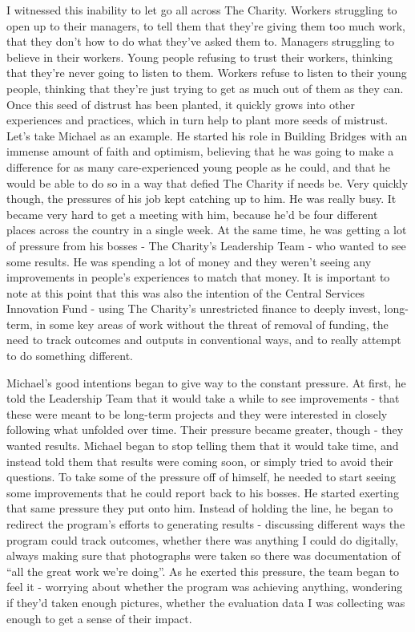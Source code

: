 I witnessed this inability to let go all across The Charity. Workers struggling to open up to their managers, to tell them that they’re giving them too much work, that they don’t how to do what they’ve asked them to. Managers struggling to believe in their workers. Young people refusing to trust their workers, thinking that they’re never going to listen to them. Workers refuse to listen to their young people, thinking that they’re just trying to get as much out of them as they can. Once this seed of distrust has been planted, it quickly grows into other experiences and practices, which in turn help to plant more seeds of mistrust. Let’s take Michael as an example. He started his role in Building Bridges with an immense amount of faith and optimism, believing that he was going to make a difference for as many care-experienced young people as he could, and that he would be able to do so in a way that defied The Charity if needs be. Very quickly though, the pressures of his job kept catching up to him. He was really busy. It became very hard to get a meeting with him, because he’d be four different places across the country in a single week. At the same time, he was getting a lot of pressure from his bosses - The Charity’s Leadership Team - who wanted to see some results. He was spending a lot of money and they weren’t seeing any improvements in people’s experiences to match that money. It is important to note at this point that this was also the intention of the Central Services Innovation Fund - using The Charity’s unrestricted finance to deeply invest, long-term, in some key areas of work without the threat of removal of funding, the need to track outcomes and outputs in conventional ways, and to really attempt to do something different.

Michael’s good intentions began to give way to the constant pressure. At first, he told the Leadership Team that it would take a while to see improvements - that these were meant to be long-term projects and they were interested in closely following what unfolded over time. Their pressure became greater, though - they wanted results. Michael began to stop telling them that it would take time, and instead told them that results were coming soon, or simply tried to avoid their questions. To take some of the pressure off of himself, he needed to start seeing some improvements that he could report back to his bosses. He started exerting that same pressure they put onto him. Instead of holding the line, he began to redirect the program’s efforts to generating results - discussing different ways the program could track outcomes, whether there was anything I could do digitally, always making sure that photographs were taken so there was documentation of “all the great work we’re doing”. As he exerted this pressure, the team began to feel it - worrying about whether the program was achieving anything, wondering if they’d taken enough pictures, whether the evaluation data I was collecting was enough to get a sense of their impact.

